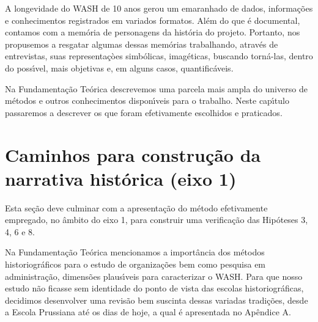 \documentclass[
12pt,		%
openright,	%
twoside,  %
a4paper,			%
chapter=TITLE,		%
english,			%
french,				%
spanish,			%
brazil				%
]{USPSC-classe/USPSC}
\begin{document}
A longevidade do WASH de 10 anos gerou um emaranhado de dados, informa\c{c}\~oes e conhecimentos registrados em variados formatos. Al\'em do que \'e documental, contamos com a mem\'oria de personagens da hist\'oria do projeto. Portanto, nos propusemos a resgatar algumas dessas mem\'orias trabalhando, atrav\'es de entrevistas, suas representa\c{c}òes simb\'olicas, imag\'eticas, buscando torn\'a-las, dentro do poss\'{\i}vel, mais objetivas e, em alguns casos, quantific\'aveis.










Na Fundamenta\c{c}\~ao Te\'orica descrevemos uma parcela mais ampla do universo de m\'etodos e outros conhecimentos dispon\'{\i}veis para o trabalho. Neste cap\'{\i}tulo passaremos a descrever os que foram efetivamente escolhidos e praticados.










\section[Caminhos para constru\c{c}\~ao da narrativa hist\'orica (eixo 1)]{Caminhos para constru\c{c}\~ao da narrativa hist\'orica (eixo 1)}\label{Caminhos para constru\c{c}\~ao da narrativa hist\'orica (eixo 1)}
Esta se\c{c}\~ao deve culminar com a apresenta\c{c}\~ao do m\'etodo efetivamente empregado, no \^ambito do eixo 1, para construir uma verifica\c{c}\~ao das Hip\'oteses 3, 4, 6 e 8.










Na Fundamenta\c{c}\~ao Te\'orica mencionamos a import\^ancia dos m\'etodos historiogr\'aficos para o estudo de organiza\c{c}\~oes bem como pesquisa em administra\c{c}\~ao, dimens\~oes plaus\'{\i}veis para caracterizar o WASH. Para que nosso estudo n\~ao ficasse sem identidade do ponto de vista das escolas historiogr\'aficas, decidimos desenvolver uma revis\~ao bem suscinta dessas variadas tradi\c{c}\~oes, desde a Escola Prussiana at\'e os dias de hoje, a qual \'e apresentada no Ap\^endice A.
\end{document}
